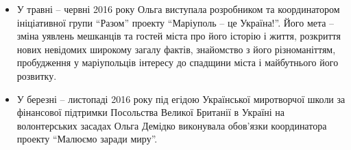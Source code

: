 \begin{itemize} %
\item У травні – червні 2016 року Ольга виступала розробником та координатором
ініціативної групи \enquote{Разом} проекту \enquote{Маріуполь – це Україна!}. Його мета – зміна
уявлень мешканців та гостей міста про його історію і життя, розкриття нових
невідомих широкому загалу фактів, знайомство з його різноманіттям, пробудження
у маріупольців інтересу до спадщини міста і майбутнього його розвитку.
\end{itemize} %


\begin{itemize} %
\item У березні – листопаді 2016 року під егідою Української миротворчої школи за
фінансової підтримки Посольства Великої Британії в Україні на волонтерських
засадах Ольга Демідко виконувала обов'язки координатора проекту \enquote{Малюємо заради
миру}.
\end{itemize} %


